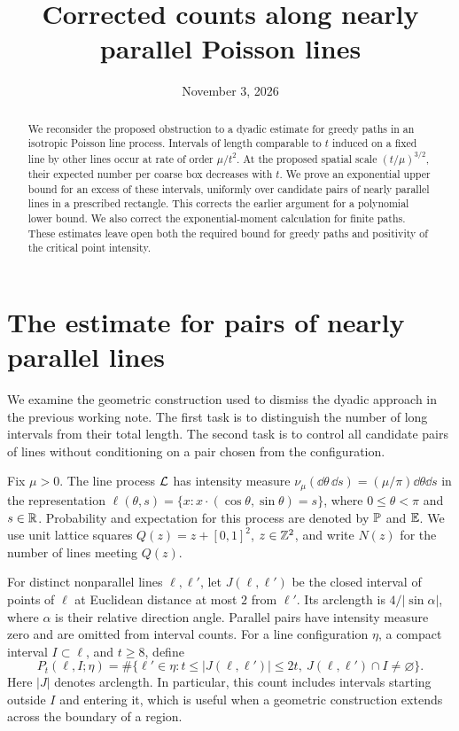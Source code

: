 \documentclass[11pt,letterpaper]{article}
\title{Corrected counts along nearly parallel Poisson lines}
\author{}
\date{November 3, 2026}
\begin{document}
\maketitle
\begin{abstract}
We reconsider the proposed obstruction to a dyadic estimate for greedy paths in an isotropic Poisson line process. Intervals of length comparable to $t$ induced on a fixed line by other lines occur at rate of order $\mu/t^2$. At the proposed spatial scale $(t/\mu)^{3/2}$, their expected number per coarse box decreases with $t$. We prove an exponential upper bound for an excess of these intervals, uniformly over candidate pairs of nearly parallel lines in a prescribed rectangle. This corrects the earlier argument for a polynomial lower bound. We also correct the exponential-moment calculation for finite paths. These estimates leave open both the required bound for greedy paths and positivity of the critical point intensity.
\end{abstract}

\section{The estimate for pairs of nearly parallel lines}

We examine the geometric construction used to dismiss the dyadic approach in the previous working note. The first task is to distinguish the number of long intervals from their total length. The second task is to control all candidate pairs of lines without conditioning on a pair chosen from the configuration.

Fix $\mu>0$. The line process $\cL$ has intensity measure $\nu_\mu(\dd\theta\,\dd s)=(\mu/\pi)\dd\theta\dd s$ in the representation $\ell(\theta,s)=\{x:x\cdot(\cos\theta,\sin\theta)=s\}$, where $0\le\theta<\pi$ and $s\in\R$. Probability and expectation for this process are denoted by $\P$ and $\E$. We use unit lattice squares $Q(z)=z+[0,1]^2$, $z\in\Z^2$, and write $N(z)$ for the number of lines meeting $Q(z)$.

For distinct nonparallel lines $\ell,\ell'$, let $J(\ell,\ell')$ be the closed interval of points of $\ell$ at Euclidean distance at most $2$ from $\ell'$. Its arclength is $4/|\sin\alpha|$, where $\alpha$ is their relative direction angle. Parallel pairs have intensity measure zero and are omitted from interval counts. For a line configuration $\eta$, a compact interval $I\subset\ell$, and $t\ge8$, define
\[
 P_t(\ell,I;\eta)
 =\#\{\ell'\in\eta: t\le |J(\ell,\ell')|\le2t,
                  \ J(\ell,\ell')\cap I\ne\varnothing\}.
\]
Here $|J|$ denotes arclength. In particular, this count includes intervals starting outside $I$ and entering it, which is useful when a geometric construction extends across the boundary of a region.
\end{document}
